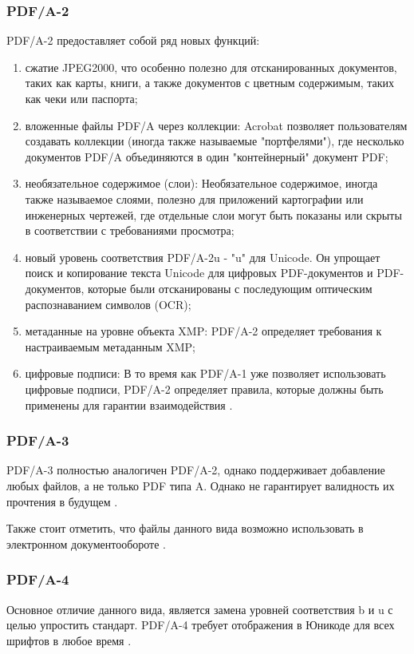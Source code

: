 \subsubsection{PDF/A-2}
PDF/A-2 предоставляет собой ряд новых функций:
\begin{enumerate}
	\item сжатие JPEG2000, что особенно полезно для отсканированных документов, таких как карты, книги, а также документов с цветным содержимым, таких как чеки или паспорта;
	\item вложенные файлы PDF/A через коллекции: Acrobat позволяет пользователям создавать коллекции (иногда также называемые "портфелями"), где несколько документов PDF/A объединяются в один "контейнерный" документ PDF;
	
	\item необязательное содержимое (слои): Необязательное содержимое, иногда также называемое слоями, полезно для приложений картографии или инженерных чертежей, где отдельные слои могут быть показаны или скрыты в соответствии с требованиями просмотра;
	\item новый уровень соответствия PDF/A-2u - "u" для Unicode. Он упрощает поиск и копирование текста Unicode для цифровых PDF-документов и PDF-документов, которые были отсканированы с последующим оптическим распознаванием символов (OCR);
	
	\item метаданные на уровне объекта XMP: PDF/A-2 определяет требования к настраиваемым метаданным XMP;
	
	\item цифровые подписи: В то время как PDF/A-1 уже позволяет использовать цифровые подписи, PDF/A-2 определяет правила, которые должны быть применены для гарантии взаимодействия \cite{pdf_a_2}.
\end{enumerate}
\subsubsection{PDF/A-3}
PDF/A-3 полностью аналогичен PDF/A-2, однако поддерживает добавление любых файлов, а не только PDF типа A. Однако не гарантирует валидность их прочтения в будущем \cite{pdf_a_2}.

Также стоит отметить, что файлы данного вида возможно использовать в электронном документообороте \cite{nalogi}.
\subsubsection{PDF/A-4}
Основное отличие данного вида, является замена уровней соответствия b и u с целью упростить стандарт. PDF/A-4 требует отображения в Юникоде для всех шрифтов в любое время \cite{pdf_a_4}.

